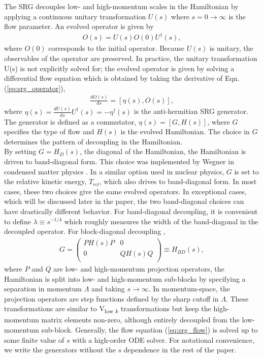 \documentclass[preprintnumbers,floatfix,aps,prc,preprint,nofootinbib]{revtex4-1}
\begin{document}
The SRG decouples low- and high-momentum scales in the Hamiltonian by applying a continuous unitary transformation $U(s)$ where $s=0 \rightarrow \infty$ is the flow parameter. An evolved operator is given by
%
\begin{eqnarray}
	\label{eq:srg_operator}
	O(s) = U(s) O(0) U^{\dagger}(s),
\end{eqnarray}
%
where $O(0)$ corresponds to the initial operator. Because $U(s)$ is unitary, the observables of the operator are preserved. In practice, the unitary transformation U(s) is not explicitly solved for; the evolved operator is given by solving a differential flow equation which is obtained by taking the derivative of Eqn. (\ref{eq:srg_operator}),
%
\begin{eqnarray}
	\label{eq:srg_flow}
	\frac{dO(s)}{ds} = [\eta(s), O(s)],
\end{eqnarray}
%
where $\eta(s)=\frac{dU(s)}{ds} U^{\dagger}(s) = -\eta^{\dagger}(s)$ is the anti-hermitian SRG generator. The generator is defined as a commutator, $\eta(s) = [G, H(s)]$, where $G$ specifies the type of flow and $H(s)$ is the evolved Hamiltonian. The choice in $G$ determines the pattern of decoupling in the Hamiltonian.
\\

By setting $G=H_D(s)$, the diagonal of the Hamiltonian, the Hamiltonian is driven to band-diagonal form. This choice was implemented by Wegner in condensed matter physics \cite{Wegner:1994ab}. In a similar option used in nuclear physics, $G$ is set to the relative kinetic energy, $T_{rel}$, which also drives to band-diagonal form. In most cases, these two choices give the same evolved operators. In exceptional cases, which will be discussed later in the paper, the two band-diagonal choices can have drastically different behavior. For band-diagonal decoupling, it is convenient to define $\lambda \equiv s^{-1/4}$ which roughly measures the width of the band-diagonal in the decoupled operator. For block-diagonal decoupling \cite{Anderson:2008mu}, 
%
\begin{eqnarray}
	\label{eq:block_diag_g}
	G =
	\begin{pmatrix}
		PH(s)P & 0 \\
		0 & QH(s)Q \\
	\end{pmatrix}
	\equiv H_{BD}(s),
\end{eqnarray}
%
where $P$ and $Q$ are low- and high-momentum projection operators, the Hamiltonian is split into low- and high-momentum sub-blocks by specifying a separation in momentum $\Lambda$ and taking $s \rightarrow \infty$. In momentum-space, the projection operators are step functions defined by the sharp cutoff in $\Lambda$. These transformations are similar to V\textsubscript{low $k$} transformations \cite{Bogner:2001gq, Bogner:2001jn, Bogner:2003wn} but keep the high-momentum matrix elements non-zero, although entirely decoupled from the low-momentum sub-block. Generally, the flow equation (\ref{eq:srg_flow}) is solved up to some finite value of $s$ with a high-order ODE solver. For notational convenience, we write the generators without the $s$ dependence in the rest of the paper.
\\
\end{document}
